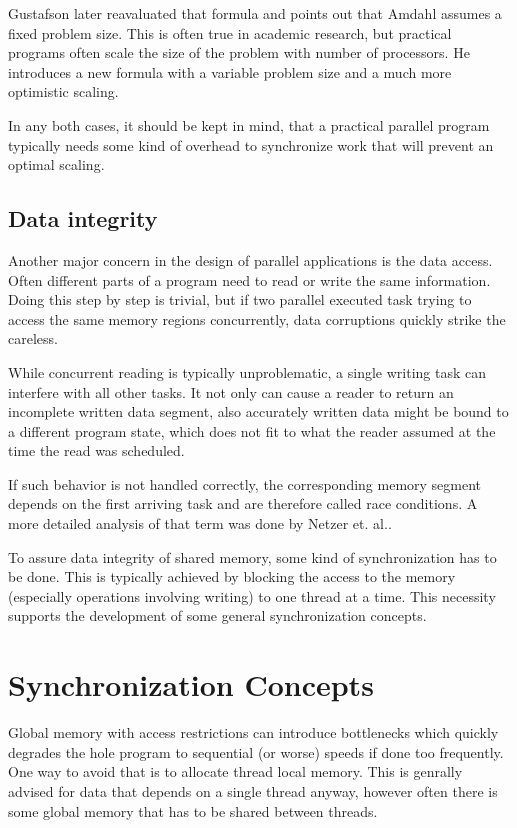Gustafson later reavaluated that formula \cite{gustafson1988reevaluating} and points out that Amdahl assumes a fixed problem size. This is often true in academic research, but practical programs often scale the size of the problem with number of processors. He introduces a new formula with a variable problem size and a much more optimistic scaling.

In any both cases, it should be kept in mind, that a practical parallel program typically needs some kind of overhead to synchronize work that will prevent an optimal scaling. 

\subsection{Data integrity}
Another major concern in the design of parallel applications is the data access. Often different parts of a program need to read or write the same information. Doing this step by step is trivial, but if two parallel executed task trying to access the same memory regions concurrently, data corruptions quickly strike the careless.

While concurrent reading is typically unproblematic, a single writing task can interfere with all other tasks. It not only can cause a reader to return an incomplete written data segment, also accurately written data might be bound to a different program state, which does not fit to what the reader assumed at the time the read was scheduled.

If such behavior is not handled correctly, the corresponding memory segment depends on the first arriving task and are therefore called race conditions. A more detailed analysis of that term was done by Netzer et. al.\cite{netzer1992race}.

To assure data integrity of shared memory, some kind of synchronization has to be done. This is typically achieved by blocking the access to the memory (especially operations involving writing) to one thread at a time. This necessity supports the development of some general synchronization concepts.

\section{Synchronization Concepts}
Global memory with access restrictions can introduce bottlenecks which quickly degrades the hole program to sequential (or worse) speeds if done too frequently. One way to avoid that is to allocate thread local memory. This is genrally advised for data that depends on a single thread anyway, however often there is some global memory that has to be shared between threads.

